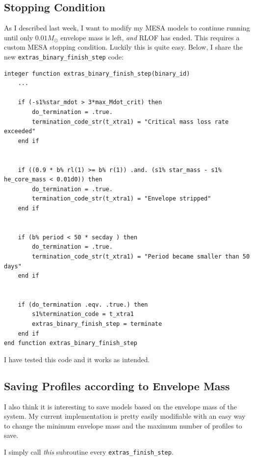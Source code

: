 \documentclass[a4paper,10pt]{article}
\begin{document}
\begin{figure}[ht]
    \centering
\end{figure}


\subsection{Stopping Condition}
As I described last week, I want to modify my MESA models to continue running until only \(0.01M_\odot \) envelope mass is left, \emph{and} RLOF has ended. This requires a custom MESA stopping condition. Luckily this is quite easy. Below, I share the new \lstinline[style=output, breaklines=true]|extras_binary_finish_step| code:
\begin{verbatim}
integer function extras_binary_finish_step(binary_id)
    ...

    if (-s1%star_mdot > 3*max_Mdot_crit) then
        do_termination = .true.
        termination_code_str(t_xtra1) = "Critical mass loss rate exceeded"
    end if


    if ((0.9 * b% rl(1) >= b% r(1)) .and. (s1% star_mass - s1% he_core_mass < 0.01d0)) then
        do_termination = .true.
        termination_code_str(t_xtra1) = "Envelope stripped"
    end if


    if (b% period < 50 * secday ) then
        do_termination = .true.
        termination_code_str(t_xtra1) = "Period became smaller than 50 days"
    end if


    if (do_termination .eqv. .true.) then
        s1%termination_code = t_xtra1
        extras_binary_finish_step = terminate
    end if
end function extras_binary_finish_step
\end{verbatim}
I have tested this code and it works as intended.
\subsection{Saving Profiles according to Envelope Mass}
I also think it is interesting to save models based on the envelope mass of the system.
My current implementation is pretty easily modifiable with an easy way to change the minimum envelope mass and the maximum number of profiles to save.

I simply call \emph{this} subroutine every \lstinline[style=output, breaklines=true]|extras_finish_step|.
\end{document}

